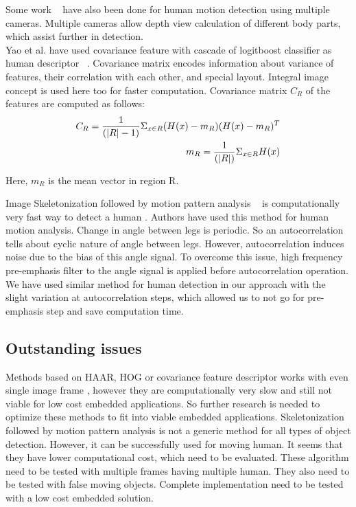 \indent Some work ~\cite{30} have also been done for human motion
detection using multiple cameras. Multiple cameras allow depth view
calculation of different body parts, which assist further in
detection.\\

\indent Yao et al. have used covariance feature with cascade of
logitboost classifier as human descriptor ~\cite{19}. Covariance matrix
encodes information about variance of features, their correlation with
each other, and special layout. Integral image concept is used here too
for faster computation. Covariance matrix $C_R$ of the features are
computed as follows:\\
\begin{eqnarray}
C_R = {1 \over {(|R| - 1)}} \Sigma _{x \in R} (H(x) - m_R) (H(x) - m_R)^T \nonumber \\
m_R = {1 \over {(|R|)}} \Sigma _{x \in R} H(x)
\end{eqnarray}

Here, $m_R$ is the mean vector in region R.

\indent Image Skeletonization followed by motion pattern analysis
~\cite{32, 22, 31} is computationally very fast way to detect a human .
Authors have used this method for human motion analysis. Change in angle
between legs is periodic. So an autocorrelation tells about cyclic
nature of angle between legs.  However, autocorrelation induces noise
due to the bias of this angle signal.  To overcome this issue, high
frequency pre-emphasis filter to the angle signal is applied before
autocorrelation operation. We have used similar method for human
detection in our approach with the slight variation at autocorrelation
steps, which allowed us to not go for pre-emphasis step and save
computation time.\\
\subsection{Outstanding issues}
\indent Methods based on HAAR, HOG or covariance feature descriptor
works with even single image frame , however they are computationally
very slow and still not viable for low cost embedded applications. So
further research is needed to optimize these methods to fit into viable
embedded applications. Skeletonization followed by motion pattern
analysis is not a generic method for all types of object detection.
However, it can be successfully used for moving human. It seems that
they have lower computational cost, which need to be evaluated. These
algorithm need to be tested with multiple frames having multiple human.
They also need to be tested with false moving objects. Complete
implementation need to be tested with a low cost embedded solution.
